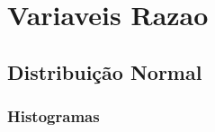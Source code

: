 \documentclass[
]{article}
\begin{document}
\hypertarget{variaveis-razao}{%
\section{Variaveis Razao}\label{variaveis-razao}}

\hypertarget{distribuiuxe7uxe3o-normal-1}{%
\subsection{Distribuição Normal}\label{distribuiuxe7uxe3o-normal-1}}

\hypertarget{histogramas}{%
\subsubsection{Histogramas}\label{histogramas}}
\end{document}
